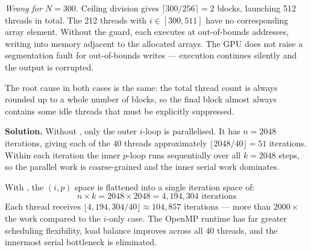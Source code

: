 \textit{Wrong for $N = 300$.}
Ceiling division gives $\lceil 300/256 \rceil = 2$ blocks, launching 512
threads in total. The 212 threads with $i \in [300, 511]$ have no
corresponding array element. Without the guard, each executes
 at out-of-bounds addresses, writing into
memory adjacent to the allocated arrays. The GPU does not raise a
segmentation fault for out-of-bounds writes --- execution continues silently
and the output is corrupted.

The root cause in both cases is the same: the total thread count is always
rounded up to a whole number of blocks, so the final block almost always
contains some idle threads that must be explicitly suppressed.

\begin{ppexercises}
\end{ppexercises}

\textbf{Solution.}
Without , only the outer $i$-loop is parallelised.
It has $n = 2048$ iterations, giving each of the 40 threads approximately
$\lfloor 2048/40 \rfloor = 51$ iterations. Within each iteration the inner
$p$-loop runs sequentially over all $k = 2048$ steps, so the parallel work
is coarse-grained and the inner serial work dominates.

With , the $(i, p)$ space is flattened into a single
iteration space of:
\[
  n \times k = 2048 \times 2048 = 4{,}194{,}304 \text{ iterations}
\]
Each thread receives $\lfloor 4{,}194{,}304/40 \rfloor \approx 104{,}857$
iterations --- more than $2000\times$ the work compared to the $i$-only case.
The OpenMP runtime has far greater scheduling flexibility, load balance
improves across all 40 threads, and the innermost serial bottleneck is
eliminated.

\begin{ppexercises}
\end{ppexercises}

